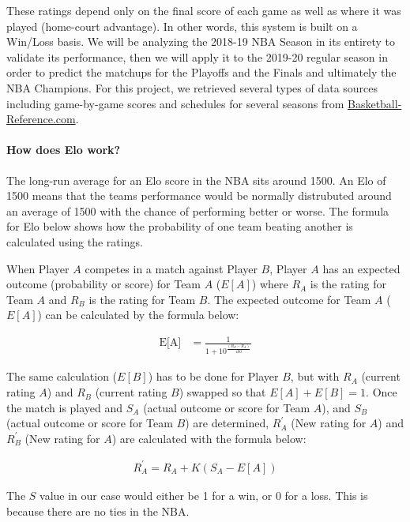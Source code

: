 \documentclass[]{article}
\let\oldparagraph\paragraph
\renewcommand{\paragraph}[1]{\oldparagraph{#1}\mbox{}}
\begin{document}
These ratings depend only on the final score of each game as well as
where it was played (home-court advantage). In other words, this system
is built on a Win/Loss basis. We will be analyzing the 2018-19 NBA
Season in its entirety to validate its performance, then we will apply
it to the 2019-20 regular season in order to predict the matchups for
the Playoffs and the Finals and ultimately the NBA Champions. For this
project, we retrieved several types of data sources including
game-by-game scores and schedules for several seasons from
\href{https://www.basketball-reference.com/}{Basketball-Reference.com}.

\hypertarget{how-does-elo-work}{%
\paragraph{How does Elo work?}\label{how-does-elo-work}}

The long-run average for an Elo score in the NBA sits around 1500. An
Elo of 1500 means that the teams performance would be normally
distrubuted around an average of 1500 with the chance of performing
better or worse. The formula for Elo below shows how the probability of
one team beating another is calculated using the ratings.

When Player \(A\) competes in a match against Player \(B\), Player \(A\)
has an expected outcome (probability or score) for Team \(A\) (\(E[A]\))
where \(R_A\) is the rating for Team \(A\) and \(R_B\) is the rating for
Team \(B\). The expected outcome for Team \(A\) (\(E[A]\)) can be
calculated by the formula below:

\[
\begin{aligned}
  \textrm{E[A]} & = \frac{1}{1 + 10^{\frac{(R_B-R_A)}{400}}}
\end{aligned}
\]

The same calculation (\(E[B]\)) has to be done for Player \(B\), but
with \(R_A\) (current rating \(A\)) and \(R_B\) (current rating \(B\))
swapped so that \(E[A] + E[B] = 1\). Once the match is played and
\(S_A\) (actual outcome or score for Team \(A\)), and \(S_B\) (actual
outcome or score for Team \(B\)) are determined, \(R^{\prime}_A\) (New
rating for \(A\)) and \(R^{\prime}_B\) (New rating for \(A\)) are
calculated with the formula below:

\[
\begin{aligned}
  R^{\prime}_A=R_A+K(S_A−E[A])
\end{aligned}
\]

The \(S\) value in our case would either be 1 for a win, or 0 for a
loss. This is because there are no ties in the NBA.
\end{document}
